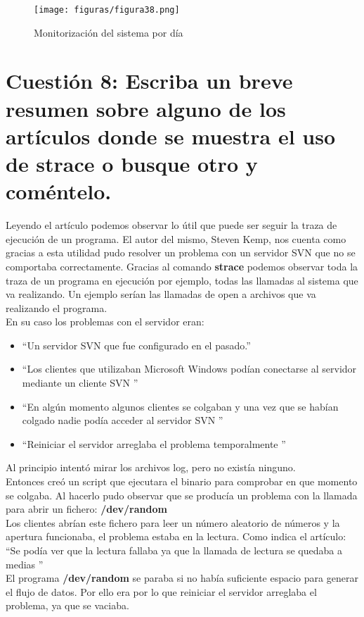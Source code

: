 \begin{figure}[H] %
	\centering
	\texttt{[image: figuras/figura38.png]}  %
	\label{figura38}
	
	\caption{Monitorización del sistema por día} 
\end{figure}

\section{Cuestión 8: Escriba un breve resumen sobre alguno de los artículos donde se muestra el uso de strace o busque otro y coméntelo.}

Leyendo el artículo \cite{strace} podemos observar lo útil que puede ser seguir la traza de ejecución de un programa. El autor del mismo, Steven Kemp, nos cuenta como gracias a esta utilidad pudo resolver un problema con un servidor SVN que no se comportaba correctamente. Gracias al comando \textbf{strace} podemos observar toda la traza de un programa en ejecución por ejemplo, todas las llamadas al sistema que va realizando. Un ejemplo serían las llamadas de open a archivos que va realizando el programa.\\
En su caso los problemas con el servidor eran:\\

\begin{itemize}
	\item \textquotedblleft Un servidor SVN que fue configurado en el pasado.\textquotedblright
	\item \textquotedblleft Los clientes que utilizaban Microsoft Windows podían conectarse al servidor mediante un cliente SVN \textquotedblright
	\item \textquotedblleft En algún momento algunos clientes se  colgaban  y una vez que se habían colgado nadie podía acceder al servidor SVN \textquotedblright
	\item \textquotedblleft Reiniciar el servidor arreglaba el problema temporalmente \textquotedblright
\end{itemize}

Al principio intentó mirar los archivos log, pero no existía ninguno.\\
Entonces creó un script que ejecutara el binario para comprobar en que momento se colgaba. Al hacerlo pudo observar que se producía un problema con la llamada para abrir un fichero: \textbf{/dev/random} \\
Los clientes abrían este fichero para leer un número aleatorio de números y la apertura funcionaba, el problema estaba en la lectura. Como indica el artículo: \textquotedblleft Se podía ver que la lectura fallaba ya que la llamada de lectura se quedaba a medias \textquotedblright \\
El programa \textbf{/dev/random} se paraba si no había suficiente espacio para generar el flujo de datos. Por ello era por lo que reiniciar el servidor arreglaba el problema, ya que se vaciaba.\\

